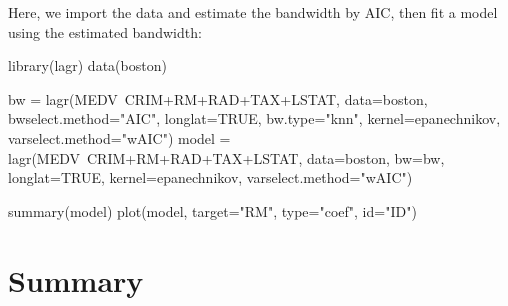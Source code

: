 Here, we import the data and estimate the bandwidth by AIC, then fit a model using the estimated bandwidth:


\begin{example}
library(lagr)
data(boston)

bw = lagr(MEDV~CRIM+RM+RAD+TAX+LSTAT, data=boston,
    bwselect.method="AIC", longlat=TRUE, bw.type="knn",
    kernel=epanechnikov, varselect.method="wAIC")
model = lagr(MEDV~CRIM+RM+RAD+TAX+LSTAT, data=boston, bw=bw,
    longlat=TRUE, kernel=epanechnikov, varselect.method="wAIC")

summary(model)
plot(model, target="RM", type="coef", id="ID")

\end{example}


\section{Summary}



\address{Wesley Brooks\\
  Department of Statistics, University of Wisconsin-Madison\\
  1300 University Ave. Madison, WI 53706\\
  USA}

